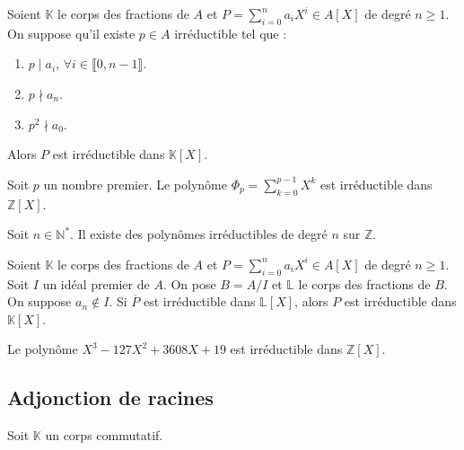 
	\begin{theorem}
		Soient $\mathbb{K}$ le corps des fractions de $A$ et $P = \sum_{i=0}^n a_i X^i \in A[X]$ de degré $n \geq 1$. On suppose qu'il existe $p \in A$ irréductible tel que :
		\begin{enumerate}[label=(\roman*)]
			\item $p \mid a_i$, $\forall i \in \llbracket 0, n-1 \rrbracket$.
			\item $p \nmid a_n$.
			\item $p^2 \nmid a_0$.
		\end{enumerate}
		Alors $P$ est irréductible dans $\mathbb{K}[X]$.
	\end{theorem}

	\begin{example}
		Soit $p$ un nombre premier. Le polynôme $\Phi_p = \sum_{k=0}^{p-1} X^k$ est irréductible dans $\mathbb{Z}[X]$.
	\end{example}


	\begin{application}
		\label{141-3}
		Soit $n \in \mathbb{N}^*$. Il existe des polynômes irréductibles de degré $n$ sur $\mathbb{Z}$.
	\end{application}


	\begin{theorem}
		Soient $\mathbb{K}$ le corps des fractions de $A$ et $P = \sum_{i=0}^n a_i X^i \in A[X]$ de degré $n \geq 1$. Soit $I$ un idéal premier de $A$. On pose $B=A/I$ et $\mathbb{L}$ le corps des fractions de $B$. On suppose $a_n \notin I$.
		\newpar
		Si $\overline{P}$ est irréductible dans $\mathbb{L}[X]$, alors $P$ est irréductible dans $\mathbb{K}[X]$.
	\end{theorem}

	\begin{example}
		Le polynôme $X^3-127X^2+3608X+19$ est irréductible dans $\mathbb{Z}[X]$.
	\end{example}

	\newpage

	\subsection{Adjonction de racines}

	Soit $\mathbb{K}$ un corps commutatif.

